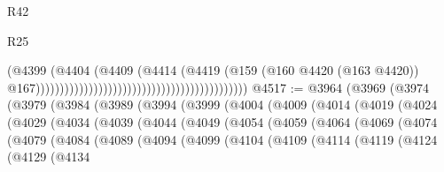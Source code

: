 \begin{lexlean}{R42}
\begin{lexlean}{R25}
\begin{coremodule}
{{{{{{{{{{{{{{{{{{{{{{{{{{{{{{{{{{{{{{{{{{{{{{{{{{{{{{{{{{{{{{{{{{{{{{{{{{{{{{{{{{{{{{{{{{{{{{{{{{{{{{{{{{{{{{{{{{{{{{{{{{{{{{{{{{{{{{{{{{{{{{{{{{{{{{{{{{{{{{{{{{{{{{{{{{{{{{{{{{{{{{{{{{{{{{{{{{{{{{{                                                                                (@4399
                                                                                  (@4404
                                                                                    (@4409
                                                                                      (@4414
                                                                                        (@4419
                                                                                          (@159
                                                                                            (@160
                                                                                              @4420
                                                                                              (@163
                                                                                                @4420))
                                                                                            @167))))))))))))))))))))))))))))))))))))))))))))
@4517 := @3964
    (@3969
      (@3974
        (@3979
          (@3984
            (@3989
              (@3994
                (@3999
                  (@4004
                    (@4009
                      (@4014
                        (@4019
                          (@4024
                            (@4029
                              (@4034
                                (@4039
                                  (@4044
                                    (@4049
                                      (@4054
                                        (@4059
                                          (@4064
                                            (@4069
                                              (@4074
                                                (@4079
                                                  (@4084
                                                    (@4089
                                                      (@4094
                                                        (@4099
                                                          (@4104
                                                            (@4109
                                                              (@4114
                                                                (@4119
                                                                  (@4124
                                                                    (@4129
                                                                      (@4134
}}}}}}}}}}}}}}}}}}}}}}}}}}}}}}}}}}}}}}}}}}}}}}}}}}}}}}}}}}}}}}}}}}}}}}}}}}}}}}}}}}}}}}}}}}}}}}}}}}}}}}}}}}}}}}}}}}}}}}}}}}}}}}}}}}}}}}}}}}}}}}}}}}}}}}}}}}}}}}}}}}}}}}}}}}}}}}}}}}}}}}}}}}}}}}}}}}}}}}}
\end{coremodule}
\end{lexlean}
\end{lexlean}
